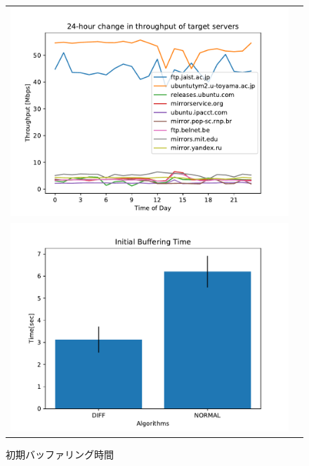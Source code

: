 \documentclass[a4j,12pt]{gradthesis_utf8}
\begin{document}
\begin{figure}[ht]
    \begin{center}
        \begin{tabular}{cc}
        	\begin{minipage}[t]{0.9\hsize}
        		\includegraphics[width=14cm]{figure/thp24h.pdf}
        		\caption{各公開ミラーの24時間の性能の変化}
        		\label{24h}
        	\end{minipage}\\
        	\begin{minipage}[t]{0.9\hsize}
        		\includegraphics[width=14cm]{figure/InitialBufferingTimePub.pdf}
        		\caption{初期バッファリング時間}
        		\label{ibtpub}
        	\end{minipage}\\

        \end{tabular}
    \end{center}
\end{figure}
\end{document}
